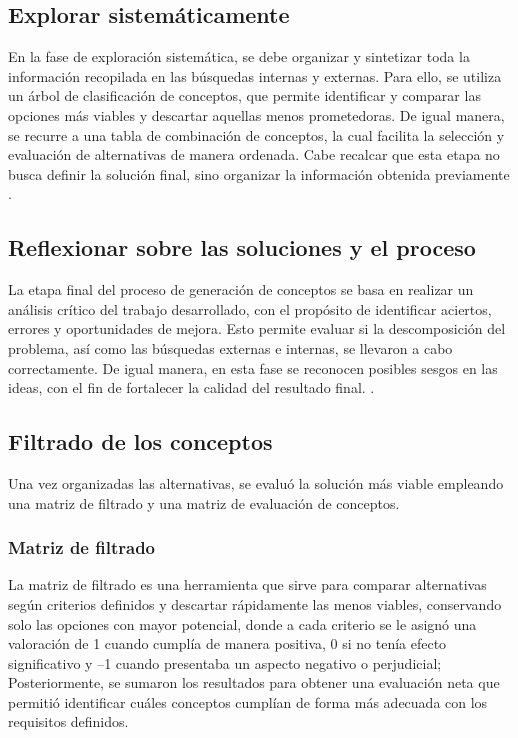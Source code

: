 \documentclass[../../DocumentoCompleto.tex]{subfiles}
\begin{document}
\subsection{Explorar sistemáticamente}
En la fase de exploración sistemática, se debe organizar y sintetizar toda la información recopilada en las búsquedas internas y externas. Para ello, se utiliza un árbol de clasificación de conceptos, que permite identificar y comparar las opciones más viables y descartar aquellas menos prometedoras. De igual manera, se recurre a una tabla de combinación de conceptos, la cual facilita la selección y evaluación de alternativas de manera ordenada. Cabe recalcar que esta etapa no busca definir la solución final, sino organizar la información obtenida previamente \parencite[133]{Ulrich2020}.


\subsection{Reflexionar sobre las soluciones y el proceso}
La etapa final del proceso de generación de conceptos se basa en realizar un análisis crítico del trabajo desarrollado, con el propósito de identificar aciertos, errores y oportunidades de mejora. Esto permite evaluar si la descomposición del problema, así como las búsquedas externas e internas, se llevaron a cabo correctamente. De igual manera, en esta fase se reconocen posibles sesgos en las ideas, con el fin de fortalecer la calidad del resultado final. \parencite[133]{Ulrich2020}.


 \subsection{Filtrado de los conceptos}
  Una vez organizadas las alternativas, se evaluó la solución más viable empleando una matriz de filtrado y una matriz de evaluación de conceptos.
  
   \subsubsection{Matriz de filtrado}
La matriz de filtrado es una herramienta que sirve para comparar alternativas según criterios definidos y descartar rápidamente las menos viables, conservando solo las opciones con mayor potencial, donde a cada criterio se le asignó una valoración de 1 cuando cumplía de manera positiva, 0 si no tenía efecto significativo y –1 cuando presentaba un aspecto negativo o perjudicial; Posteriormente, se sumaron los resultados para obtener una evaluación neta que permitió identificar cuáles conceptos cumplían de forma más adecuada con los requisitos definidos.
\end{document}
